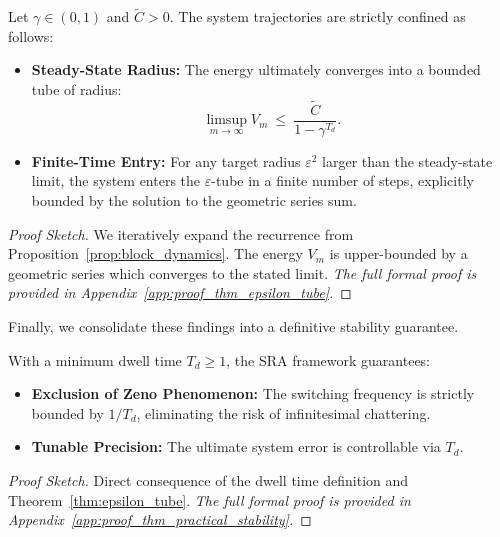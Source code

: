 \documentclass{ccjnl}
\begin{document}
\begin{theorem}
\label{thm:epsilon_tube}
Let $\gamma \in (0,1)$ and $\tilde C > 0$. The system trajectories are strictly confined as follows:
\begin{itemize}
    \item[\textit{(a)}] \textbf{Steady-State Radius:} The energy ultimately converges into a bounded tube of radius:
    \begin{equation}\label{eq:limsup_radius}
    \limsup_{m\to\infty}V_m\ \le\ \frac{\tilde C}{1-\gamma^{T_d}}.
    \end{equation}
    \item[\textit{(b)}] \textbf{Finite-Time Entry:} For any target radius $\varepsilon^2$ larger than the steady-state limit, the system enters the $\varepsilon$-tube in a finite number of steps, explicitly bounded by the solution to the geometric series sum.
\end{itemize}
\end{theorem}
\begin{proof}[Proof Sketch]
We iteratively expand the recurrence from Proposition~\ref{prop:block_dynamics}. The energy $V_m$ is upper-bounded by a geometric series which converges to the stated limit. \textit{The full formal proof is provided in Appendix~\ref{app:proof_thm_epsilon_tube}.}
\end{proof}

Finally, we consolidate these findings into a definitive stability guarantee.

\begin{theorem}
\label{thm:practical_stability}
With a minimum dwell time $T_d \ge 1$, the SRA framework guarantees:
\begin{itemize}
    \item[\textit{(a)}] \textbf{Exclusion of Zeno Phenomenon:} The switching frequency is strictly bounded by $1/T_d$, eliminating the risk of infinitesimal chattering.
    \item[\textit{(b)}] \textbf{Tunable Precision:} The ultimate system error is controllable via $T_d$.
\end{itemize}
\end{theorem}
\begin{proof}[Proof Sketch]
Direct consequence of the dwell time definition and Theorem~\ref{thm:epsilon_tube}. \textit{The full formal proof is provided in Appendix~\ref{app:proof_thm_practical_stability}.}
\end{proof}
\end{document}
